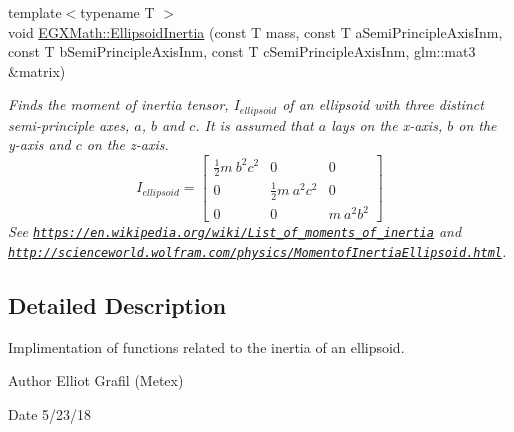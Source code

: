 \begin{DoxyCompactItemize}
{\footnotesize template$<$typename T $>$ }\\void \mbox{\hyperlink{group___e_g_x_math-_geometry-3_d-_ellipsoid-_inertia_gaed602dd93a68fdd7d4bafe883b093153}{E\+G\+X\+Math\+::\+Ellipsoid\+Inertia}} (const T mass, const T a\+Semi\+Principle\+Axis\+Inm, const T b\+Semi\+Principle\+Axis\+Inm, const T c\+Semi\+Principle\+Axis\+Inm, glm\+::mat3 \&matrix)
\begin{DoxyCompactList}\small\item\em Finds the moment of inertia tensor, $I_{ellipsoid}$ of an ellipsoid with three distinct semi-\/principle axes, $a$, $b$ and $c$. It is assumed that $a$ lays on the x-\/axis, $b$ on the y-\/axis and $c$ on the z-\/axis. \[ I_{ellipsoid}=\begin{bmatrix} \frac{1}{2}m\ b^2c^2 & 0 & 0\\ 0 & \frac{1}{2}m\ a^2c^2 & 0\\ 0 & 0 & m\ a^2b^2 \end{bmatrix} \] See \href{https://en.wikipedia.org/wiki/List_of_moments_of_inertia}{\tt https\+://en.\+wikipedia.\+org/wiki/\+List\+\_\+of\+\_\+moments\+\_\+of\+\_\+inertia} and \href{http://scienceworld.wolfram.com/physics/MomentofInertiaEllipsoid.html}{\tt http\+://scienceworld.\+wolfram.\+com/physics/\+Momentof\+Inertia\+Ellipsoid.\+html}. \end{DoxyCompactList}\end{DoxyCompactItemize}


\subsection{Detailed Description}
Implimentation of functions related to the inertia of an ellipsoid. 

\begin{DoxyAuthor}{Author}
Elliot Grafil (Metex) 
\end{DoxyAuthor}
\begin{DoxyDate}{Date}
5/23/18 
\end{DoxyDate}
